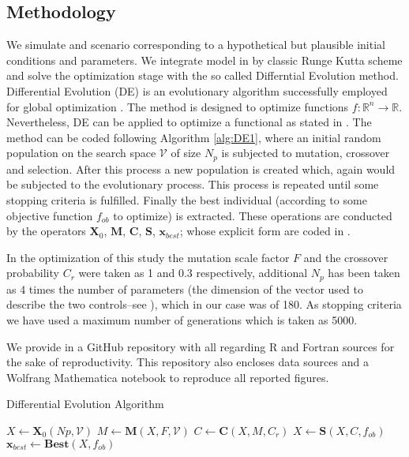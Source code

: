 \subsection{Methodology}
    We simulate and scenario corresponding to a hypothetical but plausible
initial conditions and parameters. We integrate model in
 by classic Runge Kutta scheme and solve the
optimization stage with the so called Differntial Evolution method.
Differential Evolution (DE) \cite{Storn1997} is an evolutionary
algorithm successfully employed for global optimization
\cite{Bilal2020}. The method is designed to optimize functions
$f:\mathbb{R}^n \to \mathbb{R}$. Nevertheless, DE can be applied to
optimize a functional as stated in \cite{CANTUNetAl}. The method can be
coded following Algorithm \ref{alg:DE1}, where an initial random
population on the search space $\mathcal{V}$ of size $N_p$ is subjected
to mutation, crossover and selection. After this process a new
population is created which, again would be subjected to the
evolutionary process. This process is repeated until some stopping
criteria is fulfilled. Finally the best individual (according to some
objective function $f_{ob}$ to optimize) is extracted. These operations
are conducted by the operators $\mathbf{X}_0$, $\mathbf{M}$,
$\mathbf{C}$, $\mathbf{S}$, $\mathbf{x}_{best}$;  whose explicit form
are coded in \cite{Penunuri2016}.

In the optimization of this study
the mutation scale factor $F$ and the crossover probability $C_r$ were
taken as 1 and 0.3 respectively, additional $N_p$ has been taken as 4
times the number of parameters (the dimension of the vector used to
describe the two controls--see \cite{CANTUNetAl}), which in our case was
of 180. As stopping criteria we have used a maximum number of
generations which is taken as \num{5000}.

    We provide in \cite{gitHub_b} a GitHub repository with all regarding R
and Fortran sources for the sake of reproductivity. This repository also
encloses data sources and a Wolfrang Mathematica notebook to reproduce all
reported figures.


\begin{algorithm}[htb]
  \caption{Differential Evolution Algorithm}
  \label{alg:DE1}
  \begin{algorithmic}
    \State $X \leftarrow \mathbf{X}_0(Np,\mathcal{V})$
    \State $M \leftarrow \mathbf{M}(X,F,\mathcal{V})$
    \State $C \leftarrow \mathbf{C}(X,M,C_r)$
    \State $X \leftarrow \mathbf{S}(X,C,f_{ob})$
    \EndWhile
    \State $\mathbf{x}_{best} \leftarrow \mathbf{Best}(X, f_{ob})$
  \end{algorithmic}
\end{algorithm}

